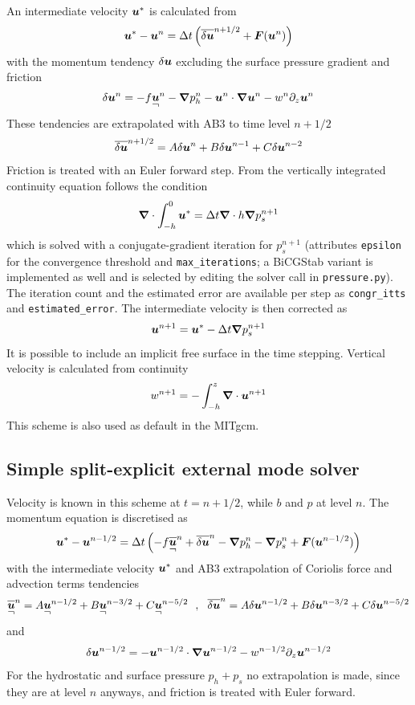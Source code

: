 \documentclass[12pt]{article}
\newcommand{\beq}  { \begin{eqnarray} }
\newcommand{\eeq}  { \end{eqnarray}}
\renewcommand{\v}[1]{{\mbox{\boldmath$ #1 $}}}  %
\newcommand{\pz}[1]{{\partial_z #1}}
\newcommand{\Bar}[1]{ \overline{ #1} }
\newcommand{\rvec} [1]{
    \raisebox{-1.5ex}{$\stackrel{\textstyle #1}{\neg}$} }%
\newcommand{\vn}{{\v \nabla}}
\newcommand{\lk}{\left(}
\newcommand{\rk}{\right)}
\begin{document}
An intermediate velocity $\v u^*$ is calculated from
\beq
\v u^* -\v  u^n = \Delta t \lk    \Bar{\delta \v u}^{n+1/2}   + \v F (\v u^{n}) \rk 
\eeq  
with the momentum tendency $\delta \v u$ excluding the surface pressure gradient and friction
\beq
 \delta \v u^n =  - f \rvec{\v u}^n - \vn  p_h^n  - \v u^n \cdot \vn \v u^n - w^n \pz{} \v u^n 
\eeq
These tendencies are extrapolated with AB3  to time level $n+1/2$ 
\beq
\Bar{ \delta \v u}^{n+1/2} = A \delta \v u^n + B \delta \v u^{n-1} + C \delta \v u^{n-2}
\eeq
Friction is treated with an Euler forward step.
From the vertically integrated continuity equation follows the condition
\beq
\vn \cdot  \int_{-h}^0  \v u^*  =  \Delta t  \vn \cdot h \vn p_s^{n+1}
\eeq
which is solved with a conjugate-gradient iteration for $p_s^{n+1}$
(attributes \verb|epsilon| for the convergence threshold and
\verb|max_iterations|; a BiCGStab variant is implemented as well and is
selected by editing the solver call in \verb|pressure.py|).
The iteration count and the estimated error are available per step as
\verb|congr_itts| and \verb|estimated_error|. The intermediate velocity is  then
corrected as
\beq
 \v u^{n+1} = \v u^* - \Delta t \vn p_s^{n+1}
\eeq
It is possible to include an implicit free surface in the time stepping.
Vertical velocity is calculated from continuity
\beq
 w^{n+1} = -  \int_{-h}^z \vn \cdot \v u^{n+1}
\eeq
This scheme is also used as default in the MITgcm.

\subsection*{Simple split-explicit external mode solver}


   
Velocity is known in this scheme at $t=n+1/2$, while $b$ and $p$ at level $n$.
The momentum equation is discretised as
\beq
\v u^* -\v  u^{n-1/2} = \Delta t \lk - f  \Bar{\rvec{\v u}}^n+   \Bar{\delta \v u}^{n}  - \vn  p_h^n - \vn p_s^n+ \v F (\v u^{n-1/2}) \rk 
\eeq  
with the intermediate velocity $\v u^*$ and 
AB3 extrapolation of Coriolis force and advection terms tendencies
\beq
 \Bar{\rvec{\v u}}^n =  A \rvec{\v u}^{n-1/2} + B \rvec{\v u}^{n-3/2} + C \rvec{\v u}^{n-5/2}
~~,~~ \Bar{ \delta \v u}^{n} = A \delta \v u^{n-1/2} + B \delta \v u^{n-3/2} + C \delta \v u^{n-5/2}
\eeq
and
\beq
 \delta \v u^{n-1/2} =     - \v u^{n-1/2} \cdot \vn \v u^{n-1/2} - w^{n-1/2} \pz{} \v u^{n-1/2}
\eeq
For the hydrostatic and surface pressure $p_h+p_s$ no extrapolation is made, since they are at level $n$ anyways, 
and friction is treated with Euler forward.
\end{document}
